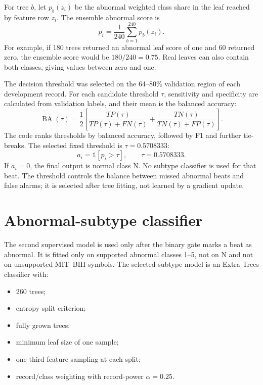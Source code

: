 For tree $b$, let $p_b(z_i)$ be the abnormal weighted class share in the leaf
reached by feature row $z_i$. The ensemble abnormal score is
\begin{equation}
 p_i=\frac{1}{240}\sum_{b=1}^{240}p_b(z_i).
 \label{eq:method-binary-score}
\end{equation}
For example, if 180 trees returned an abnormal leaf score of one and 60
returned zero, the ensemble score would be $180/240=0.75$. Real leaves can
also contain both classes, giving values between zero and one.

The decision threshold was selected on the 64--80\% validation region of each
development record. For each candidate threshold $\tau$, sensitivity and
specificity are calculated from validation labels, and their mean is the
balanced accuracy:
\begin{equation}
 \operatorname{BA}(\tau)=\frac12\left[
 \frac{TP(\tau)}{TP(\tau)+FN(\tau)}+
 \frac{TN(\tau)}{TN(\tau)+FP(\tau)}\right].
 \label{eq:method-threshold-ba}
\end{equation}
The code ranks thresholds by balanced accuracy, followed by F1 and further
tie-breaks. The selected fixed threshold is $\tau=0.5708333$:
\begin{equation}
 a_i=\mathbb{1}[p_i>\tau],\qquad \tau=0.5708333.
\end{equation}
If $a_i=0$, the final output is normal class N. No subtype classifier is used
for that beat.
The threshold controls the balance between missed abnormal beats and false
alarms; it is selected after tree fitting, not learned by a gradient update.

\section{Abnormal-subtype classifier}

The second supervised model is used only after the binary gate marks a beat as
abnormal. It is fitted only on supported abnormal classes 1--5, not on N and
not on unsupported MIT--BIH symbols. The selected subtype model is an Extra
Trees classifier with:
\begin{itemize}
\item 260 trees;
\item entropy split criterion;
\item fully grown trees;
\item minimum leaf size of one sample;
\item one-third feature sampling at each split;
\item record/class weighting with record-power $\alpha=0.25$.
\end{itemize}

